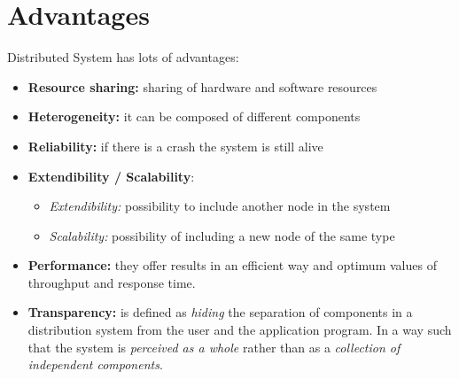 \section{Advantages}
Distributed System has lots of advantages:
\begin{itemize}
    \item \textbf{Resource sharing:} sharing of hardware and software resources
    \item \textbf{Heterogeneity:} it can be composed of different components
    \item \textbf{Reliability:} if there is a crash the system is still alive
    \item \textbf{Extendibility / Scalability}:
        \begin{itemize}
            \item \textit{Extendibility:} possibility to include another node in the system
            \item \textit{Scalability:} possibility of including a new node of the same type
        \end{itemize}
    \item \textbf{Performance:} they offer results in an efficient way and optimum values of throughput and response time.
    \item \textbf{Transparency:} is defined as \textit{hiding} the separation of components in a distribution system from the user and the application program. In a way such that the system is \textit{perceived as a whole} rather than as a \textit{collection of independent components}.
\end{itemize}

